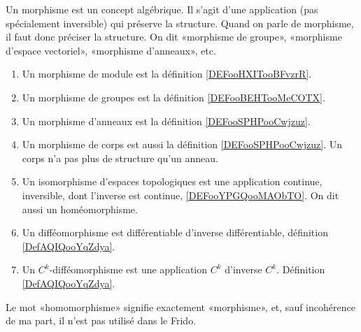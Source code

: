 	\label{THEMEooMorphismes}
Un morphisme est un concept algébrique. Il s'agit d'une application (pas spécialement inversible) qui préserve la structure. Quand on parle de morphisme, il faut donc préciser la structure. On dit «morphisme de groupe», «morphisme d'espace vectoriel», «morphisme d'anneaux», etc.
\begin{enumerate}
	\item
	      Un morphisme de module est la définition \ref{DEFooHXITooBFvzrR}.
	\item
	      Un morphisme de groupes est la définition \ref{DEFooBEHTooMeCOTX}.
	\item
	      Un morphisme d'anneaux est la définition \ref{DEFooSPHPooCwjzuz}.
	\item
	      Un morphisme de corps est aussi la définition \ref{DEFooSPHPooCwjzuz}. Un corps n'a pas plus de structure qu'un anneau.
	\item
	      Un isomorphisme d'espaces topologiques est une application continue, inversible, dont l'inverse est continue, \ref{DEFooYPGQooMAObTO}. On dit aussi un homéomorphisme.
	\item
	      Un difféomorphisme est différentiable d'inverse différentiable, définition \ref{DefAQIQooYqZdya}.
	\item
	      Un \( C^k\)-difféomorphisme est une application \( C^k\) d'inverse \( C^k\). Définition \ref{DefAQIQooYqZdya}.
\end{enumerate}
Le mot «homomorphisme» signifie exactement «morphisme», et, sauf incohérence de ma part, il n'est pas utilisé dans le Frido.
